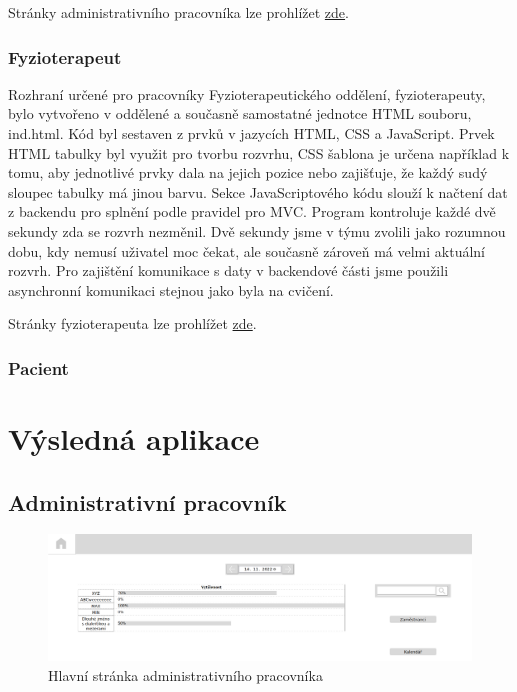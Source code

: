 Stránky administrativního pracovníka lze prohlížet \hyperlink{https://www.stud.fit.vutbr.cz/~xfojto00/ITU/adm_wkr/}{zde}.


\subsubsection*{Fyzioterapeut}

Rozhraní určené pro pracovníky Fyzioterapeutického oddělení, fyzioterapeuty, bylo vytvořeno v oddělené a současně samostatné jednotce 
HTML souboru, ind.html. Kód byl sestaven z prvků v jazycích HTML, CSS a JavaScript. Prvek HTML tabulky byl využit pro tvorbu rozvrhu, 
CSS šablona je určena například k tomu,  aby jednotlivé prvky dala na jejich pozice nebo zajišťuje, že každý sudý sloupec tabulky má jinou barvu.
Sekce JavaScriptového kódu slouží k načtení dat z backendu pro splnění podle pravidel pro MVC. Program kontroluje každé dvě sekundy zda se rozvrh 
nezměnil. Dvě sekundy jsme v týmu zvolili jako rozumnou dobu, kdy nemusí uživatel moc čekat, ale současně zároveň má velmi aktuální rozvrh. 
Pro zajištění komunikace s daty v backendové části jsme použili asynchronní komunikaci stejnou jako byla na cvičení.

Stránky fyzioterapeuta lze prohlížet \hyperlink{http://iturezervacnisystem.wz.cz/ind.html}{zde}.

\subsubsection*{Pacient}


\section*{Výsledná aplikace}

\subsection{Administrativní pracovník}

\begin{figure}[htbp]
    \centering
    \includegraphics[angle=0, origin=c, width = \textwidth]{doc/latex/fig/implementation/admin/main_page.png}
    \caption{Hlavní stránka administrativního pracovníka}
\end{figure}

